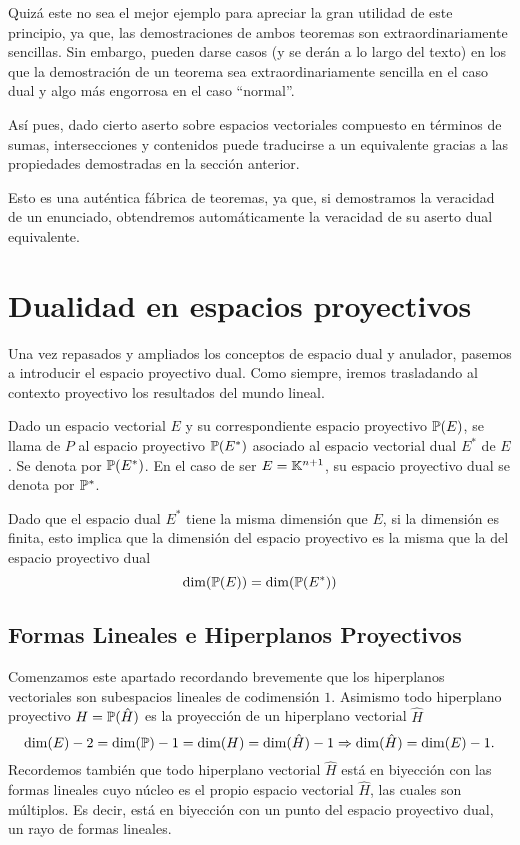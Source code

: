 Quizá este no sea el mejor ejemplo para apreciar la gran utilidad de este principio, ya que, las demostraciones de ambos teoremas son extraordinariamente sencillas. Sin embargo, pueden darse casos (y se derán a lo largo del texto) en los que la demostración de un teorema sea extraordinariamente sencilla en el caso dual y algo más engorrosa en el caso ``normal''.

Así pues, dado cierto aserto sobre espacios vectoriales compuesto en términos de sumas, intersecciones y contenidos puede traducirse a un  equivalente gracias a las propiedades demostradas en la sección anterior.

Esto es una auténtica fábrica de teoremas, ya que, si demostramos la veracidad de un enunciado, obtendremos automáticamente la veracidad de su aserto dual equivalente. 
\section{Dualidad en espacios proyectivos}
Una vez repasados y ampliados los conceptos de espacio dual y anulador, pasemos a introducir el espacio proyectivo dual. Como siempre, iremos trasladando al contexto proyectivo los resultados del mundo lineal.
\begin{defi}
	Dado un espacio vectorial $E$ y su correspondiente espacio proyectivo $\mathbb{P}(E)$, se llama  de $P$ al espacio proyectivo $\mathbb{P}(E^*)$ asociado al espacio vectorial dual $E^*$ de $E$. Se denota por $\mathbb{P}(E^*)$. En el caso de ser $E=\mathbb{K}^{n+1}$, su espacio proyectivo dual se denota por $\mathbb{P}^*$.
\end{defi}
\begin{obs}
	Dado que el espacio dual $E^*$ tiene la misma dimensión que $E$, si la dimensión es finita, esto implica que la dimensión del espacio proyectivo es la misma que la del espacio proyectivo dual
	\begin{equation*}
	\dim(\mathbb{P}(E))=\dim (\mathbb{P}(E^*))
	\end{equation*}
\end{obs}

\subsection{Formas Lineales e Hiperplanos Proyectivos}

Comenzamos este apartado recordando brevemente que los hiperplanos vectoriales son subespacios lineales de codimensión $1$. Asimismo todo hiperplano proyectivo $H=\mathbb{P}(\hat{H})$ es la proyección de un hiperplano vectorial $\hat{H}$
\begin{equation}
\dim(E)-2=\dim(\mathbb{P})-1=\dim(H)=\dim(\hat{H})-1\Rightarrow \dim(\hat{H})=\dim(E)-1.
\end{equation}
Recordemos también que todo hiperplano vectorial $\hat{H}$ está en biyección con las formas lineales cuyo núcleo es el propio espacio vectorial $\hat{H}$, las cuales son múltiplos. Es decir, está en biyección con un punto del espacio proyectivo dual, un rayo de formas lineales.

